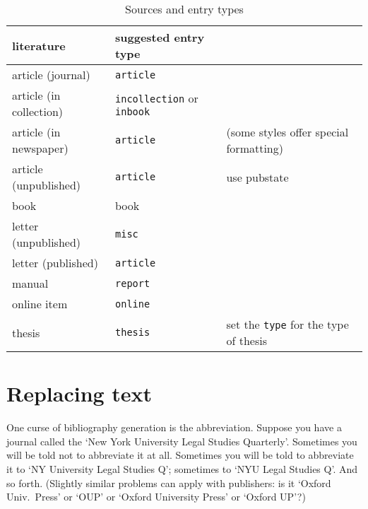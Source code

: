 \begin{table*}
\begin{tabularx}{\linewidth}{llX}
\toprule
\textsf{literature}     & \textsf{suggested entry type} &                                              \\
\midrule
article (journal)       & \texttt{article}                                                             \\
article (in collection) & \texttt{incollection} or \texttt{inbook}                                     \\
article (in newspaper)  & \texttt{article}              & (some styles offer special formatting)       \\
article (unpublished)   & \texttt{article}              & use pubstate                                 \\
book                    & book                                                                         \\
letter (unpublished)    & \texttt{misc}                                                                \\
letter (published)      & \texttt{article}                                                             \\
manual                  & \texttt{report}                                                              \\
online item             & \texttt{online}                                                              \\
thesis                  & \texttt{thesis}               & set the \texttt{type} for the type of thesis \\
\bottomrule
\end{tabularx}
\caption{Sources and entry types\label{entry:summary}}
\end{table*}

\section{Replacing text}

One curse of bibliography generation is the abbreviation. Suppose you
have a journal called the `New York University Legal Studies
Quarterly'. Sometimes you will be told not to abbreviate it at
all. Sometimes you will be told to abbreviate it to `NY University
Legal Studies Q'; sometimes to `NYU Legal Studies Q'. And so
forth. (Slightly similar problems can apply with publishers: is it
`Oxford Univ.\ Press' or `OUP' or `Oxford University Press' or `Oxford
UP'?)

